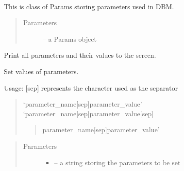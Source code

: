 \documentclass[letterpaper,10pt,english]{sphinxmanual}
\begin{document}

\begin{fulllineitems}
\label{\detokenize{index:dbm_py.interface.Params}}~

\begin{fulllineitems}
\label{\detokenize{index:dbm_py.interface.Params.__init__}}
This is class of Params storing parameters used in DBM.
\begin{quote}\begin{description}
\item[{Parameters}] \leavevmode
{} -- a Params object

\end{description}\end{quote}

\end{fulllineitems}


\begin{fulllineitems}
\label{\detokenize{index:dbm_py.interface.Params.print_all}}
Print all parameters and their values to the screen.

\end{fulllineitems}


\begin{fulllineitems}
\label{\detokenize{index:dbm_py.interface.Params.set_params}}
Set values of parameters.

Usage: {[}sep{]} represents the character used as the separator
\begin{quote}

`parameter\_name{[}sep{]}parameter\_value'
`parameter\_name{[}sep{]}parameter\_value{[}sep{]}
\begin{quote}

parameter\_name{[}sep{]}parameter\_value'
\end{quote}
\end{quote}
\begin{quote}\begin{description}
\item[{Parameters}] \leavevmode\begin{itemize}
\item {} 
 -- a string storing the parameters to be set


\end{itemize}
\end{description}
\end{quote}
\end{fulllineitems}
\end{fulllineitems}
\end{document}
